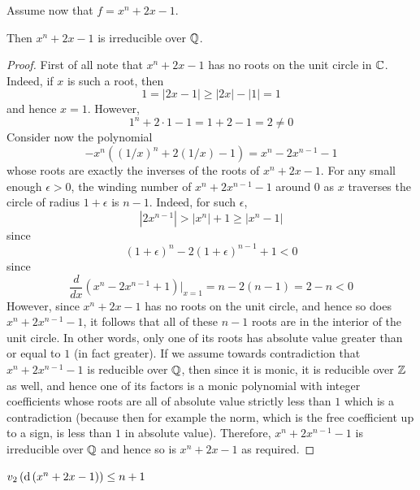 \documentclass[../main.tex]{subfiles}
\begin{document}
Assume now that $f = x^n + 2x - 1$.
\begin{lemma}
  Then $x^n + 2x - 1$ is irreducible over $\mathbb{Q}$.  
\end{lemma}
\begin{proof}
  First of all note that $x^n + 2x - 1$ has no roots on the unit circle in $\mathbb{C}$.
  Indeed, if $x$ is such a root, then 
  \[
    1 = \left| 2x - 1 \right| \geq \left| 2x \right| - \left| 1 \right| = 1 
  \]
  and hence $x = 1$.
  However, 
  \[
    1^n + 2 \cdot 1 - 1 = 
    1 +2 - 1 = 2 \neq 0
  \]
  Consider now the polynomial 
  \[
    -x^n \left( \left( 1/x \right)^n + 2 \left( 1/x \right) - 1 \right) =
    x^n - 2x^{n-1} - 1
  \]
  whose roots are exactly the inverses of the roots of $x^n + 2x - 1$.
  For any small enough $\epsilon > 0$, the winding number of $x^n + 2x^{n-1} - 1$ around $0$ as $x$ traverses the circle of radius $1 + \epsilon$ is $n - 1$.
  Indeed, for such $\epsilon$, 
  \[
    |2x^{n-1}| > |x^n| + 1 \geq |x^n - 1|
  \]
  since 
  \[
    \left( 1+\epsilon \right)^n - 2\left( 1+\epsilon \right)^{n-1} + 1 < 0
  \]
  since 
  \[
    \frac{d}{dx}\left( x^n - 2x^{n-1} + 1 \right) |_{x=1} = n - 2\left( n - 1 \right) = 2 - n < 0
  \]
  However, since $x^n + 2x - 1$ has no roots on the unit circle, and hence so does $x^n + 2x^{n-1} - 1$, it follows that all of these $n - 1$ roots are in the interior of the unit circle.
  In other words, only one of its roots has absolute value greater than or equal to $1$ (in fact greater).
  If we assume towards contradiction that $x^n + 2x^{n-1} - 1$ is reducible over $\mathbb{Q}$, then since it is monic, it is reducible over $\mathbb{Z}$ as well, and hence one of its factors is a monic polynomial with integer coefficients whose roots are all of absolute value strictly less than $1$ which is a contradiction (because then for example the norm, which is the free coefficient up to a sign, is less than $1$ in absolute value).
  Therefore, $x^n + 2x^{n-1} - 1$ is irreducible over $\mathbb{Q}$ and hence so is $x^n + 2x - 1$ as required.
\end{proof}
\begin{lemma}
  \label{lem:2-adic-valuation-of-discriminant_for_x^n+2x-1}
  $v_2\left( \operatorname{\rm d}\left( x^n + 2x - 1 \right) \right) \leq n + 1$
\end{lemma}
\end{document}

